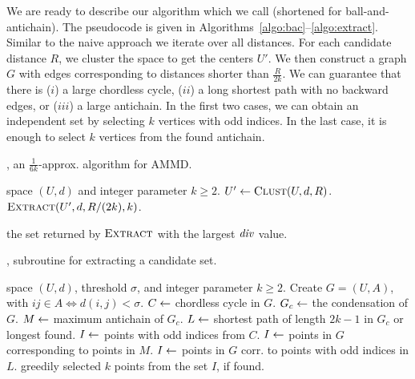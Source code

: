 We are ready to describe our algorithm which we call \algbac{} (shortened for ball-and-antichain). The pseudocode is given in Algorithms~\ref{algo:bac}--\ref{algo:extract}.
Similar to the naive approach we iterate over all distances. For each candidate distance $R$,
we cluster the space to get the centers $U'$.
We then construct a graph $G$ with edges corresponding to distances shorter than $\frac{R}{2k}$.
We can guarantee that there is ($i$) a large chordless cycle, ($ii$) a long shortest path with no backward edges,
or ($iii$) a large antichain. In the first two cases, we can obtain an independent set by selecting $k$ vertices with odd indices.
In the last case, it is enough to select $k$ vertices from the found antichain.

\begin{algorithm}[t]
\caption{, an $\frac{1}{6k}$-approx. algorithm for AMMD.}\label{algo:bac} 
\begin{algorithmic}[1]
\Require space $(U, d)$ and integer parameter $k\geq 2$.
 \label{line:loop}
	\State ${U}' \define \algclust{U, d, R}$. 
	\State $\algextract{U', d, R/(2k), k}$.
\EndFor 

\Ensure the set returned by $\algextract{}$ with the largest $\diver{}$ value.
\end{algorithmic}
\end{algorithm}

\begin{algorithm}[t]
\caption{, subroutine for extracting a candidate set.}\label{algo:extract} 
\begin{algorithmic}[1]
\Require space $(U, d)$, threshold $\sigma$, and integer parameter $k\geq 2$.
    \State Create $G = (U,A)$, with $ij \in A \Leftrightarrow d(i,j)< \sigma$.\label{line:create_G}
        \State $C \leftarrow$ chordless cycle in $G$. \label{line:cycle}
    \EndIf
    \State $G_c \leftarrow$ the condensation of $G$.
    \State $M \leftarrow$ maximum antichain of $G_c$.
    \State $L \leftarrow$ shortest path of length $2k-1$ in $G_c$ or longest found. \label{line:path}
        \State $I \leftarrow$ points with odd indices from $C$.
        \State $I \leftarrow$ points in $G$ corresponding to points in $M$.
    \Else{} 
        \State $I \leftarrow$ points in $G$ corr. to points with odd indices in $L$.
    \EndIf
\Ensure greedily selected $k$ points from the set $I$, if found.
\end{algorithmic}
\end{algorithm}

